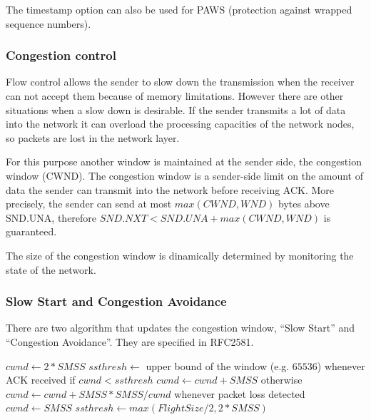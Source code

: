 The timestamp option can also be used for PAWS (protection against wrapped
sequence numbers).


\subsubsection{Congestion control}

Flow control allows the sender to slow down the transmission when the
receiver can not accept them because of memory limitations. However
there are other situations when a slow down is desirable. If the sender
transmits a lot of data into the network it can overload the processing
capacities of the network nodes, so packets are lost in the network
layer.

For this purpose another window is maintained at the sender side, the
congestion window (CWND). The congestion window is a sender-side limit
on the amount of data the sender can transmit into the network before
receiving ACK. More precisely, the sender can send at most $max(CWND, WND)$
bytes above SND.UNA, therefore $SND.NXT < SND.UNA + max(CWND, WND)$ is
guaranteed.

The size of the congestion window is dinamically determined by monitoring
the state of the network.

%
%


\subsubsection*{Slow Start and Congestion Avoidance}

There are two algorithm that updates the congestion window, ``Slow Start''
and ``Congestion Avoidance''. They are specified in RFC2581.

\begin{pseudocode}
$cwnd \gets 2*SMSS$
$ssthresh \gets$ upper bound of the window (e.g. $65536$)
whenever ACK received
  if $cwnd < ssthresh$
    $cwnd \gets cwnd + SMSS$
  otherwise
    $cwnd \gets cwnd + SMSS*SMSS/cwnd$
whenever packet loss detected
  $cwnd \gets SMSS$
  $ssthresh \gets max(FlightSize/2, 2*SMSS)$
\end{pseudocode}

